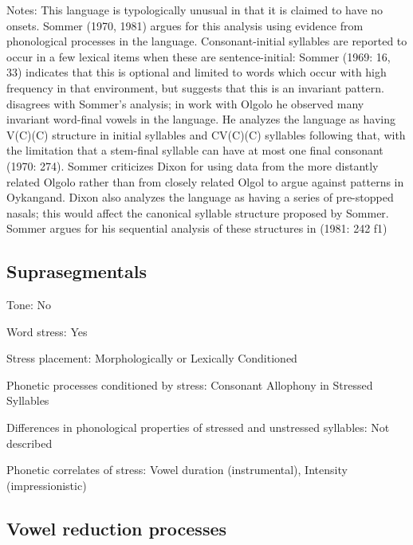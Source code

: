 {\begin{appendixdesc}
\item[Notes:] This language is typologically unusual in that it is claimed to have no onsets. Sommer (1970, 1981) argues for this analysis using evidence from phonological processes in the language. Consonant-initial syllables are reported to occur in a few lexical items when these are sentence-initial: Sommer (1969: 16, 33) indicates that this is optional and limited to words which occur with high frequency in that environment, but \citet{Sommer1981} suggests that this is an invariant pattern. \citet{Dixon1970} disagrees with Sommer’s analysis; in work with Olgolo he observed many invariant word-final vowels in the language. He analyzes the language as having V(C)(C) structure in initial syllables and CV(C)(C) syllables following that, with the limitation that a stem-final syllable can have at most one final consonant (1970: 274). Sommer criticizes Dixon for using data from the more distantly related Olgolo rather than from closely related Olgol to argue against patterns in Oykangand. Dixon also analyzes the language as having a series of pre-stopped nasals; this would affect the canonical syllable structure proposed by Sommer. Sommer argues for his sequential analysis of these structures in (1981: 242 f1)
\end{appendixdesc}
\subsection*{Suprasegmentals}
\begin{appendixdesc}
\item[Tone:] No

\item[Word stress:] Yes

\item[Stress placement:] Morphologically or Lexically Conditioned

\item[Phonetic processes conditioned by stress:] Consonant Allophony in Stressed Syllables

\item[Differences in phonological properties of stressed and unstressed syllables:] Not described

\item[Phonetic correlates of stress:] Vowel duration (instrumental), Intensity (impressionistic)
\end{appendixdesc}
\subsection*{Vowel reduction processes}
\begin{appendixdesc}


\end{appendixdesc}}
